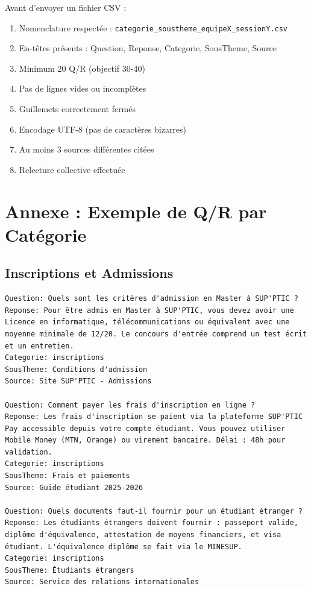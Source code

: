 \documentclass[11pt,a4paper]{article}
\begin{document}
Avant d'envoyer un fichier CSV :
\begin{enumerate}
    \item Nomenclature respectée : \texttt{categorie\_soustheme\_equipeX\_sessionY.csv}
    \item En-têtes présents : Question, Reponse, Categorie, SousTheme, Source
    \item Minimum 20 Q/R (objectif 30-40)
    \item Pas de lignes vides ou incomplètes
    \item Guillemets correctement fermés
    \item Encodage UTF-8 (pas de caractères bizarres)
    \item Au moins 3 sources différentes citées
    \item Relecture collective effectuée
\end{enumerate}

\newpage
\section{Annexe : Exemple de Q/R par Catégorie}
\label{sec:annexes}

\subsection{Inscriptions et Admissions}
\begin{lstlisting}
Question: Quels sont les critères d'admission en Master à SUP'PTIC ?
Reponse: Pour être admis en Master à SUP'PTIC, vous devez avoir une Licence en informatique, télécommunications ou équivalent avec une moyenne minimale de 12/20. Le concours d'entrée comprend un test écrit et un entretien.
Categorie: inscriptions
SousTheme: Conditions d'admission
Source: Site SUP'PTIC - Admissions

Question: Comment payer les frais d'inscription en ligne ?
Reponse: Les frais d'inscription se paient via la plateforme SUP'PTIC Pay accessible depuis votre compte étudiant. Vous pouvez utiliser Mobile Money (MTN, Orange) ou virement bancaire. Délai : 48h pour validation.
Categorie: inscriptions
SousTheme: Frais et paiements
Source: Guide étudiant 2025-2026

Question: Quels documents faut-il fournir pour un étudiant étranger ?
Reponse: Les étudiants étrangers doivent fournir : passeport valide, diplôme d'équivalence, attestation de moyens financiers, et visa étudiant. L'équivalence diplôme se fait via le MINESUP.
Categorie: inscriptions
SousTheme: Étudiants étrangers
Source: Service des relations internationales
\end{lstlisting}
\end{document}
